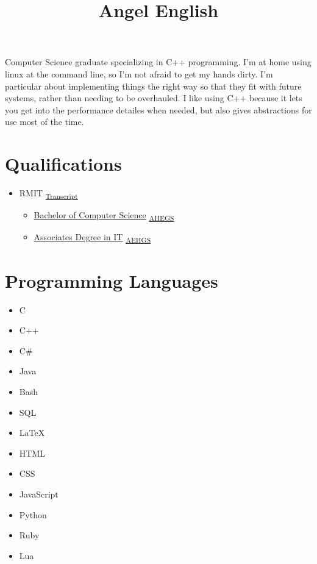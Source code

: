 \documentclass{amsart}
\title{Angel English}
\theoremstyle{definition} %
\begin{document}
\maketitle

Computer Science graduate specializing in C++ programming.
I'm at home using linux at the command line, so I'm not afraid to get
my hands dirty. I'm particular about implementing things the right
way so that they fit with future systems, rather than needing to be
overhauled. I like using C++ because it lets you get into the
performance detailes when needed, but also gives abstractions for
use most of the time.

\tableofcontents

\section{Qualifications}

\begin{itemize}
	\item
		RMIT
		\textsubscript{
			\href{https://www.myequals.net/sharelink/9ea57606-24b8-45e4-8030-4db56b0bee20/1c373231-4325-435c-b587-dab0f3481f64}{Transcript}
		}
		\begin{itemize}
			\item
				\href{https://www.myequals.net/sharelink/772babfa-f554-43b1-af4c-294eecf0b1df/f43434a3-e222-4b80-a4d9-2513723adb43}{Bachelor of Computer Science}
				\textsubscript{
					\href{https://www.myequals.net/sharelink/0ca660ab-7f1b-42fd-861b-e9b03df80363/0f37473b-f685-41bb-abd6-98d1e9dd7fb0}{AHEGS}
				}
			\item
				\href{https://www.myequals.net/sharelink/46bae55d-6a51-42f2-a6d3-ad1b9bab7f02/3dc307bb-09b1-43f1-b319-ee16fa643d2f}{Associates Degree in IT}
				\textsubscript{
					\href{https://www.myequals.net/sharelink/9ca4d745-4601-416f-a0fd-5c7334088e4a/49e877ab-89ee-4c36-a9d1-fd9f9911dc0a}{AEHGS}
				}
		\end{itemize}
\end{itemize}

\section{Programming Languages}

\begin{itemize}
	\item C
	\item C++
	\item C\#
	\item Java
	\item Bash
	\item SQL
	\item \LaTeX
	\item HTML
	\item CSS
	\item JavaScript
	\item Python
	\item Ruby
	\item Lua
\end{itemize}
\end{document}
